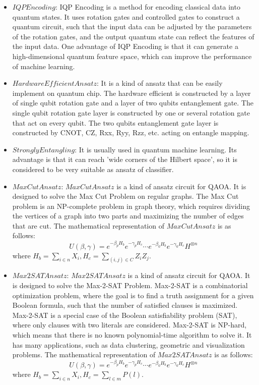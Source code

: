 \begin{itemize}
    \item $IQPEncoding$: IQP Encoding is a method for encoding classical data into quantum states. It uses rotation gates and controlled gates to construct a quantum circuit, such that the input data can be adjusted by the parameters of the rotation gates, and the output quantum state can reflect the features of the input data. One advantage of IQP Encoding is that it can generate a high-dimensional quantum feature space, which can improve the performance of machine learning.

    \item $HardwareEfficientAnsatz$: It is a kind of ansatz that can be easily implement on quantum chip. The hardware efficient is constructed by a layer of single qubit rotation gate and a layer of two qubits entanglement gate. The single qubit rotation gate layer is constructed by one or several rotation gate that act on every qubit. The two qubits entanglement gate layer is constructed by CNOT, CZ, Rxx, Ryy, Rzz, etc. acting on entangle mapping.

    \item $StronglyEntangling$: It is usually used in quantum machine learning. Its advantage is that it can reach 'wide corners of the Hilbert space'\cite{Schuld_2020}, so it is considered to be very suitable as ansatz of classifier.

    \item $MaxCutAnsatz$: $MaxCutAnsatz$ is a kind of ansatz circuit for QAOA. It is designed to solve the Max Cut Problem on regular graphs. The Max Cut problem is an NP-complete problem in graph theory, which requires dividing the vertices of a graph into two parts and maximizing the number of edges that are cut. The mathematical representation of $MaxCutAnsatz$ is as follows:
    $$U(\beta, \gamma) = e^{-\beta_pH_b}e^{-\gamma_pH_c}
    \cdots e^{-\beta_0H_b}e^{-\gamma_0H_c}H^{\otimes n}$$
    where $H_b = \sum_{i\in n}X_{i}, H_c = \sum_{(i,j)\in C}Z_iZ_j$.

    \item $Max2SATAnsatz$: $Max2SATAnsatz$ is a kind of ansatz circuit for QAOA. It is designed to solve the Max-2-SAT Problem. Max-2-SAT is a combinatorial optimization problem, where the goal is to find a truth assignment for a given Boolean formula, such that the number of satisfied clauses is maximized. Max-2-SAT is a special case of the Boolean satisfiability problem (SAT), where only clauses with two literals are considered. Max-2-SAT is NP-hard, which means that there is no known polynomial-time algorithm to solve it. It has many applications, such as data clustering, geometric and visualization problems. The mathematical representation of $Max2SATAnsatz$ is as follows:
    $$U(\beta, \gamma) = e^{-\beta_pH_b}e^{-\gamma_pH_c}
    \cdots e^{-\beta_0H_b}e^{-\gamma_0H_c}H^{\otimes n}$$
    where $H_b = \sum_{i\in n}X_{i}, H_c = \sum_{l\in m}P(l)$.


\end{itemize}
